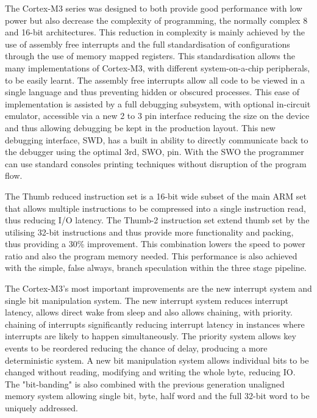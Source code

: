 The Cortex-M3 series was designed to both provide good performance with low power but also
decrease the complexity of programming, the normally complex 8 and 16-bit architectures. This
reduction in complexity is mainly achieved by the use of assembly free interrupts and the full
standardisation of configurations through the use of memory mapped registers. This standardisation
allows the many implementations of Cortex-M3, with different system-on-a-chip peripherals, to be
easily learnt. The assembly free interrupts allow all code to be viewed in a single language and thus
preventing hidden or obscured processes. This ease of implementation is assisted by a full debugging
subsystem, with optional in-circuit emulator, accessible via a new 2 to 3 pin interface reducing the
size on the device and thus allowing debugging be kept in the production layout. This new debugging
interface, \ac{SWD}, has a built in ability to directly communicate back to the
debugger using the optimal 3rd, \ac{SWO}, pin. With the \ac{SWO} the programmer can use
standard consoles printing techniques without disruption of the program flow.


The Thumb reduced instruction set is a 16-bit wide subset of the main ARM set that allows multiple
instructions to be compressed into a single instruction read, thus reducing \ac{I/O} latency. The Thumb-2
instruction set extend thumb set by the utilising 32-bit instructions and thus provide more
functionality and packing, thus providing a 30\% improvement. This combination lowers the speed to
power ratio and also the program memory needed. This performance is also achieved with the
simple, false always, branch speculation within the three stage pipeline.


The Cortex-M3's most important improvements are the new interrupt system and single bit
manipulation system. The new interrupt system reduces interrupt latency, allows direct wake from
sleep and also allows chaining, with priority. chaining of interrupts significantly reducing interrupt
latency in instances where interrupts are likely to happen simultaneously. The priority system allows
key events to be reordered reducing the chance of delay, producing a more deterministic system. A
new bit manipulation system allows individual bits to be changed without reading, modifying and
writing the whole byte, reducing IO. The "bit-banding" is also combined with the previous
generation unaligned memory system allowing single bit, byte, half word and the full 32-bit word to
be uniquely addressed.



